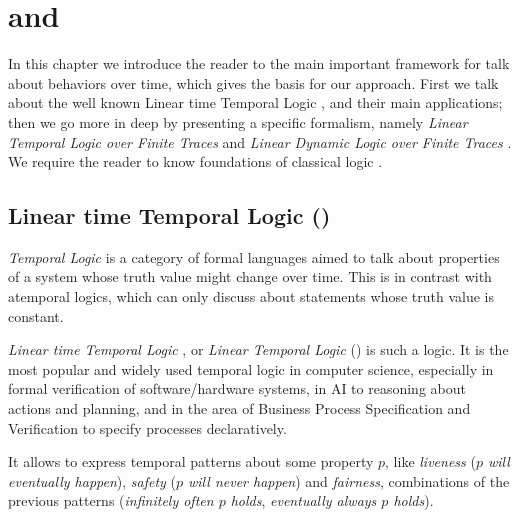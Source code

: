 \chapter{\LTLf and \LDLf}
\label{logic}

In this chapter we introduce the reader to the main important framework for talk about behaviors over time, which gives the basis for our approach.
First we talk about the well known Linear time Temporal Logic \LTL, \PDL and their main applications; then we go more in deep by presenting a specific formalism, namely \emph{Linear Temporal Logic over Finite Traces} \LTLf and \emph{Linear Dynamic Logic over Finite Traces} \LDLf.
We require the reader to know foundations of classical logic \citep{sep-logic-classical}.
\section{Linear time Temporal Logic (\LTL)}
\emph{Temporal Logic} \citep{sep-logic-temporal} is a category of formal languages aimed to talk about properties of a system whose truth value might change over time. This is in contrast with atemporal logics, which can only discuss about statements whose truth value is constant. 

\emph{Linear time Temporal Logic} \citep{Pnueli:1977:TLP:1382431.1382534}, or \emph{Linear Temporal Logic} (\LTL) is such a logic. It is the most popular and widely used temporal logic in computer science, especially in formal verification of software/hardware systems, in AI to reasoning about actions and planning, and in the area of Business Process Specification and Verification to specify processes declaratively.

It allows to express temporal patterns about some property $p$, like \emph{liveness} (\emph{$p$ will eventually happen}), \emph{safety} (\emph{$p$ will never happen}) and \emph{fairness}, combinations of the previous patterns (\emph{infinitely often $p$ holds}, \emph{eventually always $p$ holds}).

